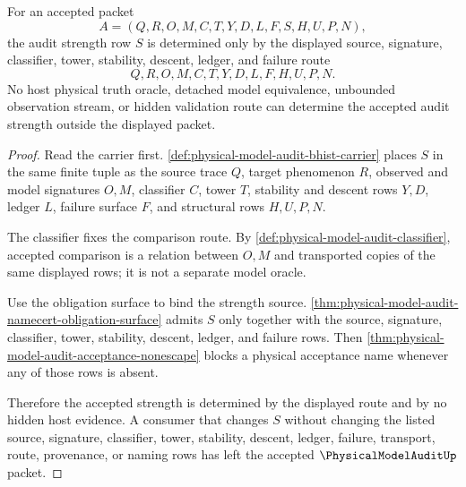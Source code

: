 \begin{theorem}
\label{thm:physical-model-audit-route-strength-determinacy}
For an accepted packet
$$
A=(Q,R,O,M,C,T,Y,D,L,F,S,H,U,P,N),
$$
the audit strength row $S$ is determined only by the displayed source, signature, classifier, tower, stability, descent, ledger, and failure route
$$
Q,R,O,M,C,T,Y,D,L,F,H,U,P,N.
$$
No host physical truth oracle, detached model equivalence, unbounded observation stream, or hidden validation route can determine the accepted audit strength outside the displayed packet.
\end{theorem}
\begin{proof}
Read the carrier first. \autoref{def:physical-model-audit-bhist-carrier} places $S$ in the same finite tuple as the source trace $Q$, target phenomenon $R$, observed and model signatures $O,M$, classifier $C$, tower $T$, stability and descent rows $Y,D$, ledger $L$, failure surface $F$, and structural rows $H,U,P,N$.

The classifier fixes the comparison route. By \autoref{def:physical-model-audit-classifier}, accepted comparison is a relation between $O,M$ and transported copies of the same displayed rows; it is not a separate model oracle.

Use the obligation surface to bind the strength source. \autoref{thm:physical-model-audit-namecert-obligation-surface} admits $S$ only together with the source, signature, classifier, tower, stability, descent, ledger, and failure rows. Then \autoref{thm:physical-model-audit-acceptance-nonescape} blocks a physical acceptance name whenever any of those rows is absent.

Therefore the accepted strength is determined by the displayed route and by no hidden host evidence. A consumer that changes $S$ without changing the listed source, signature, classifier, tower, stability, descent, ledger, failure, transport, route, provenance, or naming rows has left the accepted $\PhysicalModelAuditUp$ packet.
\end{proof}

